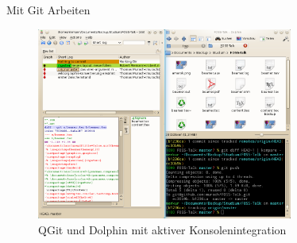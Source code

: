 \begin{frame}{Mit Git Arbeiten}
  \begin{figure}
    \includegraphics[keepaspectratio=true,width=0.75\textwidth]{qgit_dolphin}
    \caption{QGit und Dolphin mit aktiver Konsolenintegration}
  \end{figure}  
\end{frame}

